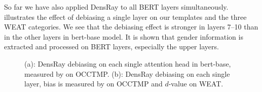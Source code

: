 So far we have also applied DensRay to all BERT layers simultaneously.  illustrates the effect of
debiasing a single  layer on our templates and the three
WEAT categories. We see that the debiasing effect is stronger in layers 7--10 than in the other layers in bert-base model. It is shown that gender information is extracted and processed on BERT layers, especially the upper layers. 
\begin{figure}[h]
	\centering
	\centering
	\caption{(a): DensRay debiasing on each single attention head in bert-base, measured by  on OCCTMP. (b): DensRay debiasing on each single layer, bias is measured by  on  OCCTMP and $d$-value on WEAT.}
\end{figure}

